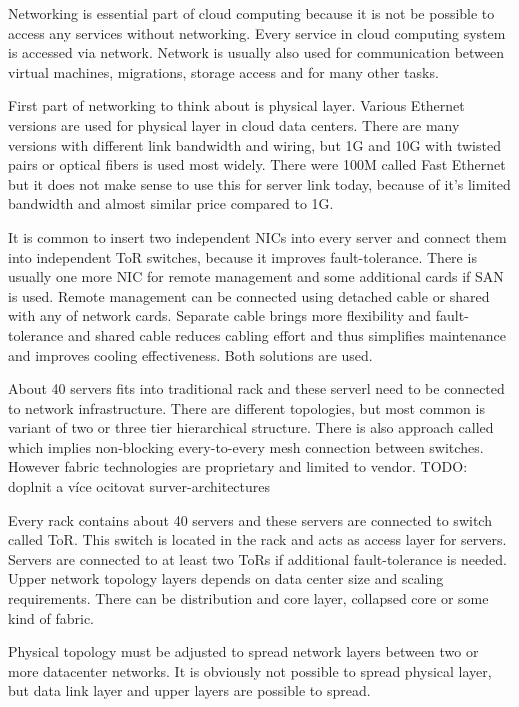 

Networking is essential part of cloud computing because it is not be possible to access any services without networking. Every service in cloud computing system is accessed via network. Network is usually also used for communication between virtual machines, migrations, storage access and for many other tasks.


First part of networking to think about is physical layer. Various Ethernet versions are used for physical layer in cloud data centers. There are many versions with different link bandwidth and wiring, but 1G and 10G with twisted pairs or optical fibers is used most widely. There were 100M called Fast Ethernet but it does not make sense to use this for server link today, because of it's limited bandwidth and almost similar price compared to 1G.

It is common to insert two independent \Ac{NIC}s into every server and connect them into independent \Ac{ToR} switches, because it improves fault-tolerance. There is usually one more \Ac{NIC} for remote management and some additional cards if \Ac{SAN} is used. Remote management can be connected using detached cable or shared with any of network cards. Separate cable brings more flexibility and fault-tolerance and shared cable reduces cabling effort and thus simplifies maintenance and improves cooling effectiveness. Both solutions are used. 

About 40 servers fits into traditional rack and these serverl need to be connected to network infrastructure. There are different topologies, but most common is variant of two or three tier hierarchical structure. \cite{survey-architectures} There is also approach called  which implies non-blocking every-to-every mesh connection between switches. However fabric technologies are proprietary and limited to vendor. TODO: doplnit a více ocitovat surver-architectures

Every rack contains about 40 servers and these servers are connected to switch called \Ac{ToR}. This switch is located in the rack and acts as access layer for servers. Servers are connected to at least two \Ac{ToR}s if additional fault-tolerance is needed. Upper network topology layers depends on data center size and scaling requirements. There can be distribution and core layer, collapsed core or some kind of fabric.

Physical topology must be adjusted to spread network layers between two or more datacenter networks. It is obviously not possible to spread physical layer, but data link layer and upper layers are possible to spread.

